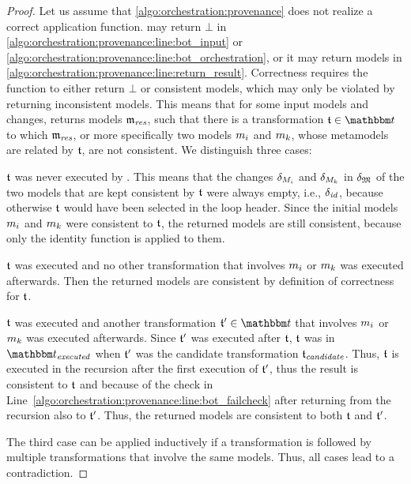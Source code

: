 \begin{proof}
    Let us assume that \autoref{algo:orchestration:provenance} does not realize a correct application function.
     may return $\bot$ in \autoref{algo:orchestration:provenance:line:bot_input} or \autoref{algo:orchestration:provenance:line:bot_orchestration}, or it may return models in \autoref{algo:orchestration:provenance:line:return_result}.
    Correctness requires the function to either return $\bot$ or consistent models, which may only be violated by  returning inconsistent models.
    This means that for some input models and changes,  returns models $\modeltuple{m}_\mathvariable{res}$, such that there is a transformation $\transformation{t} \in \transformationset{T}$ to which $\modeltuple{m}_\mathvariable{res}$, or more specifically two models $\model{m}{i}$ and $\model{m}{k}$, 
    whose metamodels are related by $\transformation{t}$, are not consistent.
    We distinguish three cases:
    \begin{longenumerate}
        \item $\transformation{t}$ was never executed by . This means that the changes $\change{\metamodel{M}{i}}$ and $\change{\metamodel{M}{k}}$ in $\change{\metamodeltuple{M}}$ of the two models that are kept consistent by $\transformation{t}$ were always empty, i.e., $\delta_{\mathit{id}}$, because otherwise $\transformation{t}$ would have been selected in the loop header. Since the initial models $\model{m}{i}$ and $\model{m}{k}$ were consistent to $\transformation{t}$, the returned models are still consistent, because only the identity function is applied to them.
        \item $\transformation{t}$ was executed and no other transformation that involves $\model{m}{i}$ or $\model{m}{k}$ was executed afterwards. Then the returned models are consistent by definition of correctness for $\transformation{t}$.
        \item $\transformation{t}$ was executed and another transformation $\transformation{t}' \in \transformationset{T}$ that involves $\model{m}{i}$ or $\model{m}{k}$ was executed afterwards.
        Since $\transformation{t}'$ was executed after $\transformation{t}$, $\transformation{t}$ was in $\provalgexecuted$ when $\transformation{t}'$ was the candidate transformation $\provalgcandidate$.
        Thus, $\transformation{t}$ is executed in the recursion after the first execution of $\transformation{t}'$, thus the result is consistent to $\transformation{t}$ and because of the check in Line~\ref{algo:orchestration:provenance:line:bot_failcheck} after returning from the recursion also to $\transformation{t}'$. Thus, the returned models are consistent to both $\transformation{t}$ and $\transformation{t}'$.
    \end{longenumerate}
    The third case can be applied inductively if a transformation is followed by multiple transformations that involve the same models. Thus, all cases lead to a contradiction.
\end{proof}

